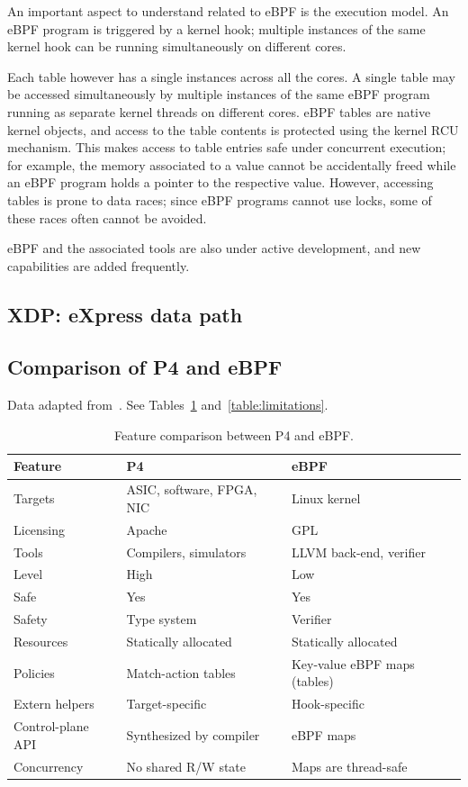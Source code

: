 An important aspect to understand related to eBPF is the execution
model. An eBPF program is triggered by a kernel hook; multiple
instances of the same kernel hook can be running simultaneously on
different cores.

Each table however has a single instances across all the cores. A
single table may be accessed simultaneously by multiple instances of
the same eBPF program running as separate kernel threads on different
cores. eBPF tables are native kernel objects, and access to the table
contents is protected using the kernel RCU mechanism. This makes
access to table entries safe under concurrent execution; for example,
the memory associated to a value cannot be accidentally freed while an
eBPF program holds a pointer to the respective value. However,
accessing tables is prone to data races; since eBPF programs cannot
use locks, some of these races often cannot be avoided.

eBPF and the associated tools are also under active development, and
new capabilities are added frequently.

\subsection{XDP: eXpress data path}

\subsection{Comparison of P4 and eBPF}

Data adapted from~\cite{minao-hspr18}.  See Tables~\ref{table:compare}
and~\ref{table:limitations}.

\begin{table}[h]
  \begin{center}
  \begin{tabular}{|l|l|l|} \hline
    \textbf{Feature} & \textbf{P4} & \textbf{eBPF} \\ \hline \hline
    Targets & ASIC, software, FPGA, NIC & Linux kernel \\ \hline
    Licensing & Apache & GPL \\ \hline
    Tools & Compilers, simulators & LLVM back-end, verifier \\ \hline
    Level & High & Low \\ \hline
    Safe  & Yes & Yes \\ \hline
    Safety & Type system & Verifier \\ \hline
    Resources & Statically allocated & Statically allocated \\ \hline
    Policies & Match-action tables & Key-value eBPF maps (tables) \\ \hline
    Extern helpers & Target-specific & Hook-specific \\ \hline
    Control-plane API & Synthesized by compiler & eBPF maps \\ \hline
    Concurrency & No shared R/W state & Maps are thread-safe \\ \hline
  \end{tabular}
  \caption{Feature comparison between P4 and eBPF.}\label{table:compare}
  \end{center}
\end{table}

